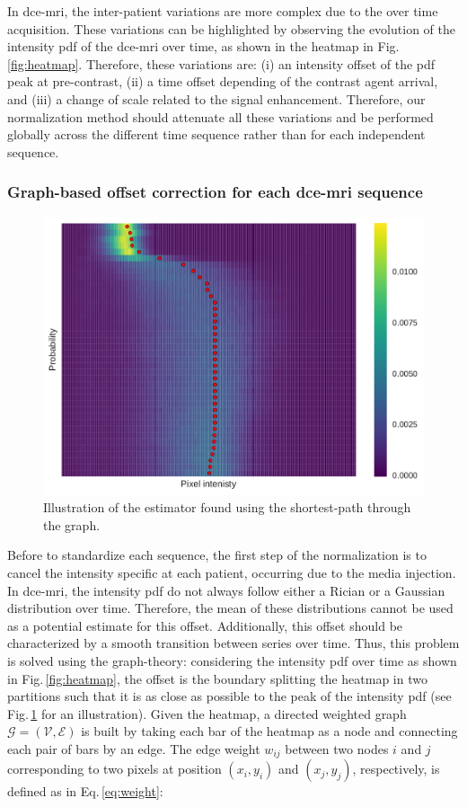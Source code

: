 In \ac{dce}-\ac{mri}, the inter-patient variations are more complex due to the over time acquisition.
These variations can be highlighted by observing the evolution of the intensity \ac{pdf} of the \ac{dce}-\ac{mri} over time, as shown in the heatmap in Fig.\,\ref{fig:heatmap}.
Therefore, these variations are:
(i) an intensity offset of the \ac{pdf} peak at pre-contrast,
(ii) a time offset depending of the contrast agent arrival, and
(iii) a change of scale related to the signal enhancement.
Therefore, our normalization method should attenuate all these variations and be performed globally across the different time sequence rather than for each independent sequence.

\subsubsection{Graph-based offset correction for each \ac{dce}-\ac{mri} sequence}

\begin{figure}
  \centering
  \includegraphics[width=0.7\linewidth]{02_methods/figures/estimator.pdf}
  \caption{Illustration of the estimator found using the shortest-path through the graph.}
  \label{fig:estimator}
\end{figure}

Before to standardize each sequence, the first step of the normalization is to cancel the intensity specific at each patient, occurring due to the media injection.
In \ac{dce}-\ac{mri}, the intensity \ac{pdf} do not always follow either a Rician or a Gaussian distribution over time.
Therefore, the mean of these distributions cannot be used as a potential estimate for this offset.
Additionally, this offset should be characterized by a smooth transition between series over time.
Thus, this problem is solved using the graph-theory: considering the intensity \ac{pdf} over time as shown in Fig.\,\ref{fig:heatmap}, the offset is the boundary splitting the heatmap in two partitions such that it is as close as possible to the peak of the intensity \ac{pdf} (see Fig.\,\ref{fig:estimator} for an illustration).
Given the heatmap, a directed weighted graph $\mathcal{G}=(\mathcal{V}, \mathcal{E})$ is built by taking each bar of the heatmap as a node and connecting each pair of bars by an edge.
The edge weight $w_{ij}$ between two nodes $i$ and $j$ corresponding to two pixels at position $(x_i, y_i)$ and $(x_j, y_j)$, respectively, is defined as in Eq.\,\eqref{eq:weight}:

